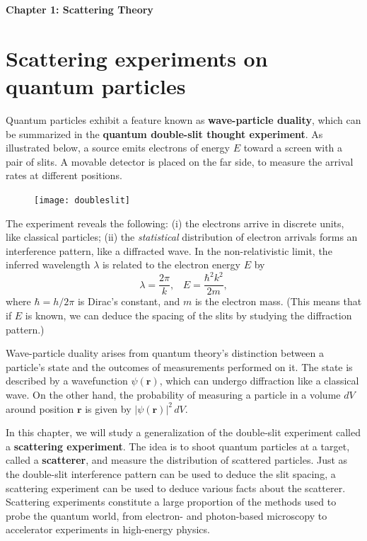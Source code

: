 \documentclass[pra,12pt]{revtex4}
\begin{document}
\begin{center}
{\Large \textbf{Chapter 1: Scattering Theory}}
\end{center}


\section{Scattering experiments on quantum particles}

Quantum particles exhibit a feature known as \textbf{wave-particle
  duality}, which can be summarized in the \textbf{quantum double-slit
  thought experiment}.  As illustrated below, a source emits electrons
of energy $E$ toward a screen with a pair of slits.  A movable
detector is placed on the far side, to measure the arrival rates at
different positions.

\begin{figure}[h]
  \centering\texttt{[image: doubleslit]}
\end{figure}

The experiment reveals the following: (i) the electrons arrive in
discrete units, like classical particles; (ii) the
\textit{statistical} distribution of electron arrivals forms an
interference pattern, like a diffracted wave.  In the non-relativistic
limit, the inferred wavelength $\lambda$ is related to the electron
energy $E$ by
\begin{equation}
  \lambda = \frac{2\pi}{k}, \;\;\; E = \frac{\hbar^2k^2}{2m},
\end{equation}
where $\hbar = h/2\pi$ is Dirac's constant, and $m$ is the electron
mass.  (This means that if $E$ is known, we can deduce the spacing of
the slits by studying the diffraction pattern.)

Wave-particle duality arises from quantum theory's distinction between
a particle's state and the outcomes of measurements performed on it.
The state is described by a wavefunction $\psi(\mathbf{r})$, which can
undergo diffraction like a classical wave.  On the other hand, the
probability of measuring a particle in a volume $dV$ around position
$\mathbf{r}$ is given by $|\psi(\mathbf{r})|^2 \,dV$.

In this chapter, we will study a generalization of the double-slit
experiment called a \textbf{scattering experiment}.  The idea is to
shoot quantum particles at a target, called a \textbf{scatterer}, and
measure the distribution of scattered particles.  Just as the
double-slit interference pattern can be used to deduce the slit
spacing, a scattering experiment can be used to deduce various facts
about the scatterer.  Scattering experiments constitute a large
proportion of the methods used to probe the quantum world, from
electron- and photon-based microscopy to accelerator experiments in
high-energy physics.
\end{document}
